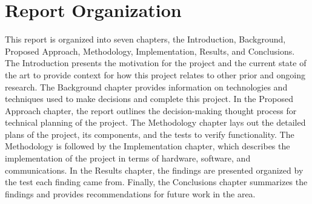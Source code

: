 \section{Report Organization}
This report is organized into seven chapters, the Introduction, Background, Proposed Approach, Methodology, Implementation, Results, and Conclusions. The Introduction presents the motivation for the project and the current state of the art to provide context for how this project relates to other prior and ongoing research. The Background chapter provides information on technologies and techniques used to make decisions and complete this project. In the Proposed Approach chapter, the report outlines the decision-making thought process for technical planning of the project. The Methodology chapter lays out the detailed plans of the project, its components, and the tests to verify functionality. The Methodology is followed by the Implementation chapter, which describes the implementation of the project in terms of hardware, software, and communications. In the Results chapter, the findings are presented organized by the test each finding came from. Finally, the Conclusions chapter summarizes the findings and provides recommendations for future work in the area.